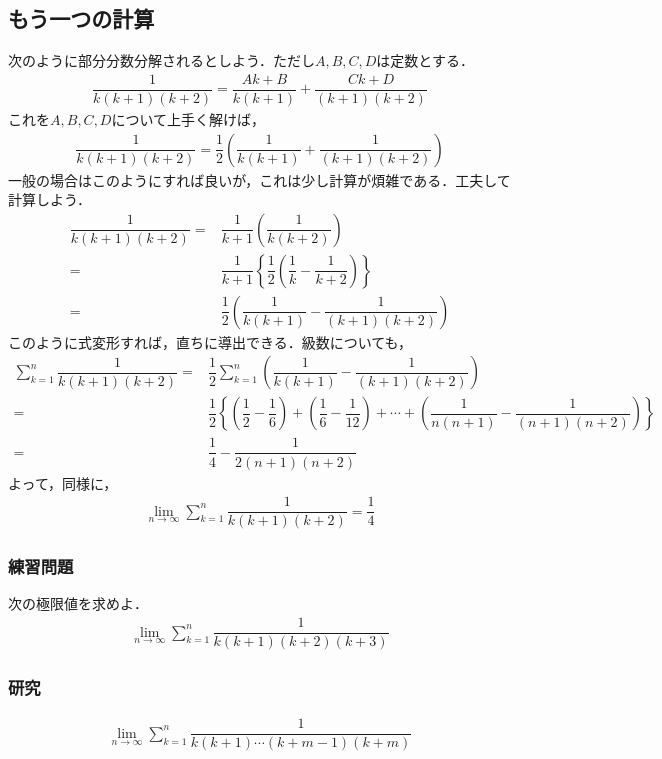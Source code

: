\documentclass[12pt]{jsarticle}
\begin{document}
\subsection*{もう一つの計算}
次のように部分分数分解されるとしよう．ただし$A,B,C,D$は定数とする．
\begin{align*}
\dfrac{1}{k(k+1)(k+2)} = \dfrac{Ak+B}{k(k+1)} + \dfrac{Ck+D}{(k+1)(k+2)}
\end{align*}
これを$A,B,C,D$について上手く解けば，
\begin{align*}
\dfrac{1}{k(k+1)(k+2)} = \dfrac{1}{2} \left( \dfrac{1}{k(k+1)} + \dfrac{1}{(k+1)(k+2)} \right)
\end{align*}
一般の場合はこのようにすれば良いが，これは少し計算が煩雑である．工夫して計算しよう．
\begin{align*}
\dfrac{1}{k(k+1)(k+2)} =& \dfrac{1}{k+1} \left( \dfrac{1}{k(k+2)} \right) \\
=&\dfrac{1}{k+1} \left\{ \dfrac{1}{2} \left( \dfrac{1}{k} - \dfrac{1}{k+2} \right) \right\} \\
=&\dfrac{1}{2} \left( \dfrac{1}{k(k+1)} - \dfrac{1}{(k+1)(k+2)} \right)
\end{align*}
このように式変形すれば，直ちに導出できる．級数についても，
\begin{align*}
\sum_{k=1}^{n}\dfrac{1}{k(k+1)(k+2)} =& \dfrac{1}{2} \sum_{k=1}^{n} \left( \dfrac{1}{k(k+1)} - \dfrac{1}{(k+1)(k+2)} \right) \\
=& \dfrac{1}{2} \left\{ \left( \dfrac{1}{2} - \dfrac{1}{6} \right) + \left( \dfrac{1}{6} - \dfrac{1}{12} \right) + \cdots + \left( \dfrac{1}{n(n+1)} - \dfrac{1}{(n+1)(n+2)} \right) \right\} \\
=& \dfrac{1}{4} - \dfrac{1}{2(n+1)(n+2)}
\end{align*}
よって，同様に，
\begin{align*}
\lim_{n \to \infty}\sum_{k=1}^{n} \dfrac{1}{k(k+1)(k+2)} = \dfrac{1}{4}
\end{align*}

\subsubsection*{練習問題}
次の極限値を求めよ．
\begin{align*}
\lim_{n \to \infty}\sum_{k=1}^{n} \dfrac{1}{k(k+1)(k+2)(k+3)}
\end{align*}
\subsubsection*{研究}
\begin{align*}
\lim_{n \to \infty}\sum_{k=1}^{n} \dfrac{1}{k(k+1)\cdots(k+m-1)(k+m)}
\end{align*}
\end{document}
